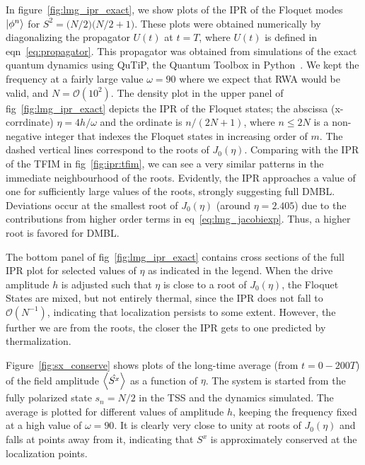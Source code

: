 \documentclass[%
reprint,
superscriptaddress,
amsmath,amssymb,
aps,
prb,
showkeys,
]{revtex4-2}
\begin{document}
	In figure~\ref{fig:lmg_ipr_exact}, we show plots of the IPR of the Floquet modes $\ket{\phi^n}$ for $S^2 = \big(N/2\big)\big(N/2 + 1\big)$.
These plots were obtained numerically by diagonalizing the propagator $U(t)$ at $t=T$, where $U(t)$ is defined in eqn~\ref{eq:propagator}. This propagator was obtained from simulations of the exact quantum dynamics using QuTiP, the Quantum Toolbox in Python~\cite{qutip}. We kept the frequency at a fairly large value $\omega = 90$ where we expect that RWA would be valid, and $N=\mathcal{O}(10^2)$. The density plot in the upper panel of fig~\ref{fig:lmg_ipr_exact} depicts the IPR of the Floquet states; the abscissa (x-corrdinate)  $\eta=4h/\omega$ and the ordinate is $n/(2N+1)$, where $n\leq 2N$ is a non-negative integer that indexes the Floquet states in increasing order of $m$. The dashed vertical lines correspond to the roots of $J_0(\eta)$. Comparing with the IPR of the TFIM in fig~\ref{fig:ipr:tfim}, we can see a very similar patterns in the immediate neighbourhood of the roots. Evidently, the IPR approaches a value of one for sufficiently large values of the roots, strongly suggesting full DMBL. Deviations occur at the smallest root of $J_0(\eta)$ (around $\eta = 2.405$) due to the contributions from higher order terms in eq~\ref{eq:lmg_jacobiexp}. Thus, a higher root is favored for DMBL.

The bottom panel of fig~\ref{fig:lmg_ipr_exact} contains cross sections of the full IPR plot for selected values of $\eta$ as indicated in the legend. When the drive amplitude $h$ is adjusted such that $\eta$ is close to a root of $J_0(\eta)$, the Floquet States are mixed, but not entirely thermal, since the IPR does not fall to $\mathcal{O}(N^{-1})$, indicating that localization persists to some extent. However, the further we are from the roots, the closer the IPR gets to one predicted by thermalization.

Figure~\ref{fig:sx_conserve} shows plots of the long-time average (from $t=0-200T$) of the field amplitude $\expval{\hat{S^x}}$ as a function of $\eta$. The system is started from the fully polarized state $s_n=N/2$ in the TSS and the dynamics simulated. The average is plotted for different values of amplitude $h$, keeping the frequency fixed at a high value of $\omega=90$. It is clearly very close to unity at roots of $J_0(\eta)$ and falls at points away from it, indicating that $S^x$ is approximately conserved at the localization points.
\end{document}
